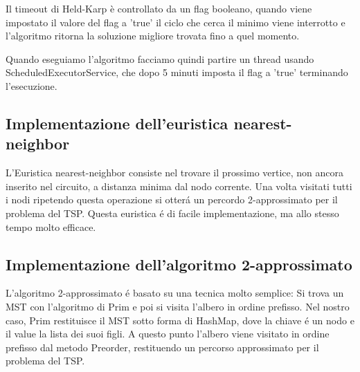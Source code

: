 Il timeout di Held-Karp è controllato da un flag booleano, quando viene impostato il valore del flag a 'true' il ciclo che cerca il minimo viene interrotto e l'algoritmo ritorna la soluzione migliore trovata fino a quel momento.

Quando eseguiamo l'algoritmo facciamo quindi partire un thread usando ScheduledExecutorService, che dopo 5 minuti imposta il flag a 'true' terminando l'esecuzione.

\subsection{Implementazione dell'euristica nearest-neighbor}
L'Euristica nearest-neighbor consiste nel trovare il prossimo vertice, non ancora inserito nel circuito, a distanza minima dal nodo corrente. Una volta visitati tutti i nodi
ripetendo questa operazione si otter\'a un percordo 2-approssimato per il problema del TSP. Questa euristica \'e di facile implementazione, ma allo stesso tempo molto efficace.

\subsection{Implementazione dell'algoritmo 2-approssimato}
L'algoritmo 2-approssimato \'e basato su una tecnica molto semplice: Si trova un MST con l'algoritmo di Prim e poi si visita l'albero in ordine prefisso.
Nel nostro caso, Prim restituisce il MST sotto forma di HashMap, dove la chiave \'e un nodo e il value la lista dei suoi figli. A questo punto l'albero viene visitato in ordine
prefisso dal metodo Preorder, restituendo un percorso approssimato per il problema del TSP.